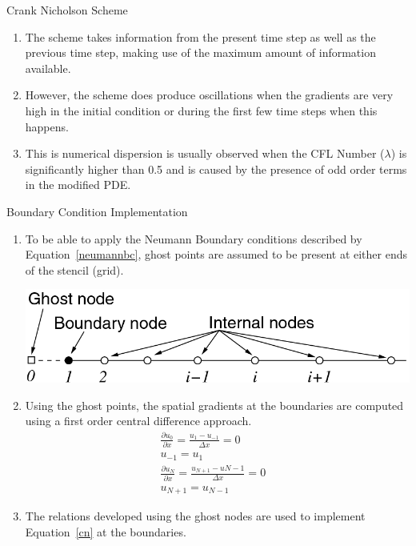 \documentclass[10pt,compress]{beamer}
\begin{document}
\begin{frame}{Crank Nicholson Scheme}
\begin{enumerate}
\item The scheme takes information from the present time step as well as the previous time step, making use of the maximum amount of information available.
\item However, the scheme does produce oscillations when the gradients are very high in the initial condition or during the first few time steps when this happens.
\item This is numerical dispersion is usually observed when the CFL Number ($\lambda$) is significantly higher than 0.5 and is caused by the presence of odd order terms in the modified PDE.
\end{enumerate}
\end{frame}

\begin{frame}{Boundary Condition Implementation}
\begin{enumerate}
	\item To be able to apply the Neumann Boundary conditions described by Equation~\ref{neumannbc}, ghost points are assumed to be present at either ends of the stencil (grid).
\begin{center}
	\includegraphics[scale=1]{ghost.png}
\end{center}
\item Using the ghost points, the spatial gradients at the boundaries are computed using a first order central difference approach.
\begin{align*}	
	\frac{\partial u_{0}}{\partial x}=\frac{u_{1}-u_{-1}}{\Delta x}=0 & \\
	u_{-1}=u_{1} & \\
	\frac{\partial u_{N}}{\partial x}=\frac{u_{N+1}-u{N-1}}{\Delta x}=0 &\\
	u_{N+1}=u_{N-1} & 
\end{align*}
\item The relations developed using the ghost nodes are used to implement Equation~\ref{cn} at the boundaries.
\end{enumerate}
\end{frame}
\end{document}
